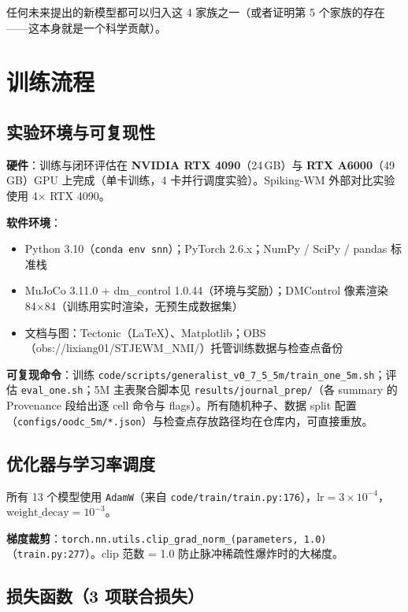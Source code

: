 \documentclass[11pt,a4paper]{article}
\begin{document}
任何未来提出的新模型都可以归入这 4 家族之一（或者证明第 5 个家族的存在——这本身就是一个科学贡献）。

\section{训练流程}

\subsection{实验环境与可复现性}

\textbf{硬件}：训练与闭环评估在 \textbf{NVIDIA RTX 4090}（24\,GB）与 \textbf{RTX A6000}（49\,GB）GPU 上完成（单卡训练，4 卡并行调度实验）。Spiking-WM 外部对比实验使用 4× RTX 4090。

\textbf{软件环境}：
\begin{itemize}[leftmargin=2em]
    \item Python 3.10（\texttt{conda env snn}）；PyTorch 2.6.x；NumPy / SciPy / pandas 标准栈
    \item MuJoCo 3.11.0 + dm\_control 1.0.44（环境与奖励）；DMControl 像素渲染 84×84（训练用实时渲染，无预生成数据集）
    \item 文档与图：Tectonic（LaTeX）、Matplotlib；OBS（obs://lixiang01/STJEWM\_NMI/）托管训练数据与检查点备份
\end{itemize}
\textbf{可复现命令}：训练 \texttt{code/scripts/generalist\_v0\_7\_5\_5m/train\_one\_5m.sh}；评估 \texttt{eval\_one.sh}；5M 主表聚合脚本见 \texttt{results/journal\_prep/}（各 summary 的 Provenance 段给出逐 cell 命令与 flags）。所有随机种子、数据 split 配置（\texttt{configs/oodc\_5m/*.json}）与检查点存放路径均在仓库内，可直接重放。

\subsection{优化器与学习率调度}

所有 13 个模型使用 \texttt{AdamW}（来自 \texttt{code/train/train.py:176}），$\text{lr} = 3 \times 10^{-4}$，$\text{weight\_decay} = 10^{-3}$。

\textbf{梯度裁剪}：\texttt{torch.nn.utils.clip\_grad\_norm\_(parameters, 1.0)}（\texttt{train.py:277}）。clip 范数 = 1.0 防止脉冲稀疏性爆炸时的大梯度。

\subsection{损失函数（3 项联合损失）}
\end{document}
